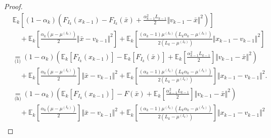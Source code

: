 \documentclass[12pt]{article}
\begin{document}
\begin{proof}
            {\allowdisplaybreaks
            \begin{align*}
                & \mathbb E_k\left[
                    (1 - \alpha_k)\left(
                        F_{I_k}(x_{k - 1}) - F_{I_k}(\bar x) + \frac{\alpha_{k - 1}^2L_{k - 1}}{2}\Vert v_{k - 1} - \bar x\Vert^2
                    \right)
                \right]
                    \\ &\quad 
                    + \mathbb E_k \left[
                        \frac{\alpha_k(\mu - \mu^{(I_k)})}{2} \Vert \bar x - v_{k - 1}\Vert^2
                    \right]
                    + \mathbb E_k\left[
                        \frac{(\alpha_k - 1)\mu^{(I_k)}\left(L_k\alpha_k - \mu^{(I_k)}\right)}{2\left(L_k - \mu^{(I_k)}\right)}\Vert x_{k - 1} - v_{k - 1} \Vert^2
                    \right]
                \\
                &\underset{\text{(1)}}{=} 
                (1 - \alpha_k)\left(
                        \mathbb E_k \left[F_{I_k}(x_{k - 1})\right] 
                        -\mathbb E_k [F_{I_k}(\bar x)] 
                        + \mathbb E_k \left[\frac{\alpha_{k - 1}^2L_{k - 1}}{2}\right]\Vert v_{k - 1} - \bar x\Vert^2
                \right)
                    \\ &\quad 
                    + \mathbb E_k \left[
                        \frac{\alpha_k(\mu - \mu^{(I_k)})}{2} 
                    \right]\Vert \bar x - v_{k - 1}\Vert^2
                    + \mathbb E_k\left[
                        \frac{(\alpha_k - 1)\mu^{(I_k)}\left(L_k\alpha_k - \mu^{(I_k)}\right)}{2\left(L_k - \mu^{(I_k)}\right)}
                    \right]\Vert x_{k - 1} - v_{k - 1} \Vert^2. 
                \\
                &\underset{\text{(h)}}{=} 
                (1 - \alpha_k)\left(
                        \mathbb E_k \left[F_{I_k}(x_{k - 1})\right] 
                        - F(\bar x)
                        + \mathbb E_k \left[\frac{\alpha_{k - 1}^2L_{k - 1}}{2}\right]\Vert v_{k - 1} - \bar x\Vert^2
                \right)
                    \\ &\quad 
                    + \mathbb E_k \left[
                        \frac{\alpha_k(\mu - \mu^{(I_k)})}{2} 
                    \right]\Vert \bar x - v_{k - 1}\Vert^2
                    + \mathbb E_k\left[
                        \frac{(\alpha_k - 1)\mu^{(I_k)}\left(L_k\alpha_k - \mu^{(I_k)}\right)}{2\left(L_k - \mu^{(I_k)}\right)}
                    \right]\Vert x_{k - 1} - v_{k - 1} \Vert^2
                \\

\end{align*}}
\end{proof}
\end{document}
